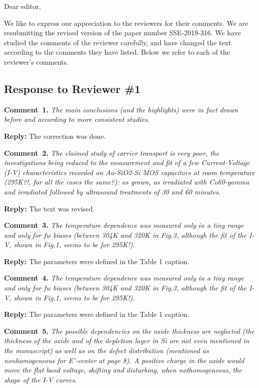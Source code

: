 \documentclass[aip,jap,preprint]{revtex4-1}
\begin{document}
Dear editor,

We like to express our appreciation to the reviewers for their comments.
We are resubmitting the revised version of the paper number  SSE-2019-316.
We have studied the comments of the reviewer carefully, and have changed the text according to the comments they
have listed.
Below we refer to each of the reviewer’s comments.



\subsection*{Response to Reviewer \#1 }

\noindent
\textcolor[rgb]{0.00,0.50,1.00}{\textbf{Comment~1.}}
\emph{The main conclusions (and the highlights) were in fact drawn before and according to more consistent studies.}

\noindent
\textcolor[rgb]{0.51,0.00,0.00}{\textbf{Reply:}}
The correction was done.



\noindent
\textcolor[rgb]{0.00,0.50,1.00}{\textbf{Comment~2.}}
\emph{The claimed study of carrier transport is very poor, the investigations being reduced to the measurement and fit of a few Current-Voltage (I-V) characteristics recorded on Au-SiO2-Si MOS capacitors at room temperature (295K?!, for all the cases the same?): as grown, as irradiated with Co60-gamma and irradiated followed by ultrasound treatments of 30 and 60 minutes.}

\noindent
\textcolor[rgb]{0.51,0.00,0.00}{\textbf{Reply:}}
The text was revised.

\noindent
\textcolor[rgb]{0.00,0.50,1.00}{\textbf{Comment~3.}}
\emph{The temperature dependence was measured only in a tiny range and only for fw biases (between 304K and 320K in Fig.3, although the fit of the I-V, shown in Fig.1, seems to be for 295K!).}


\noindent
\textcolor[rgb]{0.51,0.00,0.00}{\textbf{Reply:}}
The parameters were defined in the Table 1 caption.


\noindent
\textcolor[rgb]{0.00,0.50,1.00}{\textbf{Comment~4.}}
\emph{The temperature dependence was measured only in a tiny range and only for fw biases (between 304K and 320K in Fig.3, although the fit of the I-V, shown in Fig.1, seems to be for 295K!).}


\noindent
\textcolor[rgb]{0.51,0.00,0.00}{\textbf{Reply:}}
The parameters were defined in the Table 1 caption.

\noindent
\textcolor[rgb]{0.00,0.50,1.00}{\textbf{Comment~5.}}
\emph{The possible dependencies on the oxide thickness are neglected (the thickness of the oxide and of the depletion layer in Si are not even mentioned in the manuscript) as well as on the defect distribution (mentioned as nonhomogeneous for E’-center at page 8). A positive charge in the oxide would move the flat band voltage, shifting and disturbing, when nothomogeneous, the shape of the I-V curves.}
\end{document}
